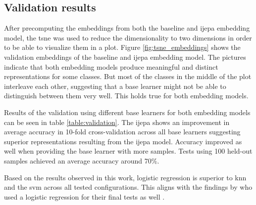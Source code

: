\subsection{Validation results}
\label{sec:validation_results}

After precomputing the embeddings from both the baseline and \gls{ijepa} embedding model, the \gls{tsne} was used 
to reduce the dimensionality to two dimensions in order to be able to visualize them in a plot. 
Figure \ref{fig:tsne_embeddings} shows the validation embeddings of the baseline and \gls{ijepa} embedding model.
The pictures indicate that both embedding models produce meaningful and distinct representations for some classes. 
But most of the classes in the middle of the plot interleave each other, suggesting that a base learner might not be 
able to distinguish between them very well. This holds true for both embedding models.

Results of the validation using different base learners for both embedding models can be seen in table 
\ref{table:validation}. The \gls{ijepa} shows an improvement in average accuracy in 10-fold cross-validation 
across all base learners suggesting superior representations resulting from the \gls{ijepa} model. 
Accuracy improved as well when providing the base learner with more samples. Tests using 100 held-out samples
achieved an average accuracy around 70\%.

Based on the results observed in this work, logistic regression is superior to \gls{knn} and the \gls{svm}
across all tested configurations. This aligns with the findings by \citeauthor{tian_rethinking_2020} who 
used a logistic regression for their final tests as well \cite{tian_rethinking_2020}.

